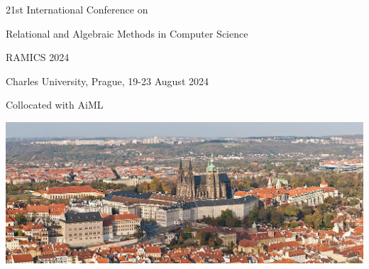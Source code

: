 \documentclass[a3paper, 12pt]{article}
\begin{document}
\begin{center}
  {\Huge 21st International Conference on}

  \medskip

  {\Huge Relational and Algebraic Methods in Computer Science}

  \bigskip

  {\fontsize{36}{50}\selectfont RAMICS 2024}

  \bigskip

  {\Huge Charles University, Prague, 19-23 August 2024}

  \medskip

  {\Huge Collocated with AiML}
  
  \bigskip

  \includegraphics[width=.7\linewidth, trim=0 20 0 0, clip]{prague}

  \medskip
\end{center}
\end{document}
